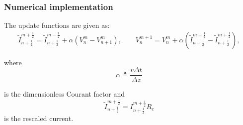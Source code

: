 \subsubsection{Numerical implementation}

The update functions are given as:
\begin{align}
    \tilde{I}^{m+\frac{1}{2}}_{n+\frac{1}{2}} = \tilde{I}^{m-\frac{1}{2}}_{n+\frac{1}{2}} + \alpha\left(V^{m}_{n} - V^{m}_{n+1}\right) \label{update}, \quad\quad
    V^{m+1}_n = V^{m}_{n} + \alpha\left(\tilde{I}^{m+\frac{1}{2}}_{n-\frac{1}{2}}-\tilde{I}^{m+\frac{1}{2}}_{n+\frac{1}{2}}\right),  
    \end{align}
    
where
\begin{equation}
\alpha \triangleq \frac{v\Delta t}{\Delta z}
    \label{alpha}
\end{equation}

is the dimensionless Courant factor and
\begin{equation}
    \tilde{I}^{m+\frac{1}{2}}_{n+\frac{1}{2}} = I^{m+\frac{1}{2}}_{n+\frac{1}{2}}R_c
    \label{Itil}
\end{equation}
is the rescaled current.

